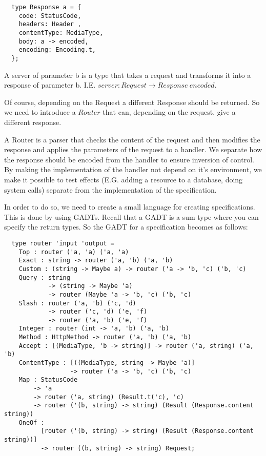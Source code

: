 \begin{lstlisting}
  type Response a = {
    code: StatusCode,
    headers: Header ,
    contentType: MediaType,
    body: a -> encoded,
    encoding: Encoding.t,
  };
\end{lstlisting}

A server of parameter b is a type that takes a request and transforms it into a
response of parameter b. I.E.  $server : Request\rightarrow Response\ encoded$.

Of course, depending on the Request a different Response should be returned. So
we need to introduce a $Router$ that can, depending on the request, give a
different response. 

A Router is a parser that checks the content of the request and then modifies
the response and applies the parameters of the request to a handler. We separate
how the response should be encoded from the handler to ensure inversion of
control. By making the implementation of the handler not depend on it's
environment, we make it possible to test effects (E.G. adding a resource to a
database, doing system calls) separate from the implementation of the
specification. 

In order to do so, we need to create a small language for creating
specifications. This is done by using GADTs. Recall that a GADT is a sum type
where you can specify the return types. So the GADT for a specification becomes
as follows:

\begin{lstlisting}
  type router 'input 'output =
    Top : router ('a, 'a) ('a, 'a)
    Exact : string -> router ('a, 'b) ('a, 'b)
    Custom : (string -> Maybe a) -> router ('a -> 'b, 'c) ('b, 'c)
    Query : string 
            -> (string -> Maybe 'a) 
            -> router (Maybe 'a -> 'b, 'c) ('b, 'c)
    Slash : router ('a, 'b) ('c, 'd) 
            -> router ('c, 'd) ('e, 'f) 
            -> router ('a, 'b) ('e, 'f) 
    Integer : router (int -> 'a, 'b) ('a, 'b)
    Method : HttpMethod -> router ('a, 'b) ('a, 'b)
    Accept : [(MediaType, 'b -> string)] -> router ('a, string) ('a, 'b)
    ContentType : [((MediaType, string -> Maybe 'a)]
                  -> router ('a -> 'b, 'c) ('b, 'c)
    Map : StatusCode 
        -> 'a 
        -> router ('a, string) (Result.t('c), 'c)
        -> router ('(b, string) -> string) (Result (Response.content string))
    OneOf :
          [router ('(b, string) -> string) (Result (Response.content string))]
          -> router ((b, string) -> string) Request;
\end{lstlisting}


